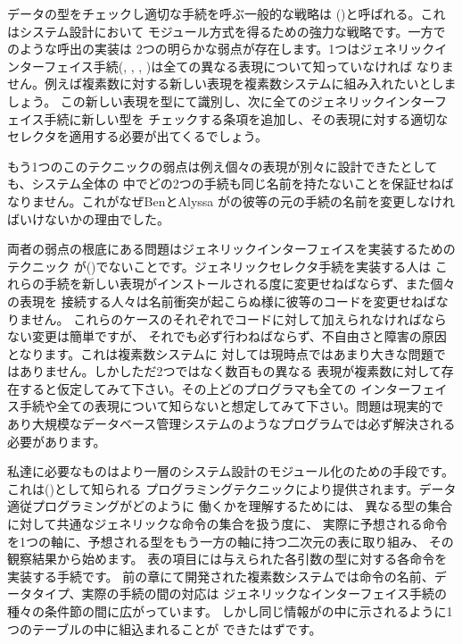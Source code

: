 データの型をチェックし適切な手続を呼ぶ一般的な戦略は
()と呼ばれる。これはシステム設計において
モジュール方式を得るための強力な戦略です。一方でのような呼出の実装は
2つの明らかな弱点が存在します。1つはジェネリックインターフェイス手続(,
, , )は全ての異なる表現について知っていなければ
なりません。例えば複素数に対する新しい表現を複素数システムに組み入れたいとしましょう。
この新しい表現を型にて識別し、次に全てのジェネリックインターフェイス手続に新しい型を
チェックする条項を追加し、その表現に対する適切なセレクタを適用する必要が出てくるでしょう。


もう1つのこのテクニックの弱点は例え個々の表現が別々に設計できたとしても、システム全体の
中でどの2つの手続も同じ名前を持たないことを保証せねばなりません。これがなぜBenとAlyssa
がの彼等の元の手続の名前を変更しなければいけないかの理由でした。



両者の弱点の根底にある問題はジェネリックインターフェイスを実装するためのテクニック
が()でないことです。ジェネリックセレクタ手続を実装する人は
これらの手続を新しい表現がインストールされる度に変更せねばならず、また個々の表現を
接続する人々は名前衝突が起こらぬ様に彼等のコードを変更せねばなりません。
これらのケースのそれぞれでコードに対して加えられなければならない変更は簡単ですが、
それでも必ず行わねばならず、不自由さと障害の原因となります。これは複素数システムに
対しては現時点ではあまり大きな問題ではありません。しかしただ2つではなく数百もの異なる
表現が複素数に対して存在すると仮定してみて下さい。その上どのプログラマも全ての
インターフェイス手続や全ての表現について知らないと想定してみて下さい。問題は現実的で
あり大規模なデータベース管理システムのようなプログラムでは必ず解決される必要があります。



私達に必要なものはより一層のシステム設計のモジュール化のための手段です。
これは()として知られる
プログラミングテクニックにより提供されます。データ適従プログラミングがどのように
働くかを理解するためには、
異なる型の集合に対して共通なジェネリックな命令の集合を扱う度に、
実際に予想される命令を1つの軸に、予想される型をもう一方の軸に持つ二次元の表に取り組み、
その観察結果から始めます。
表の項目には与えられた各引数の型に対する各命令を実装する手続です。
前の章にて開発された複素数システムでは命令の名前、データタイプ、実際の手続の間の対応は
ジェネリックなインターフェイス手続の種々の条件節の間に広がっています。
しかし同じ情報がの中に示されるように1つのテーブルの中に組込まれることが
できたはずです。



